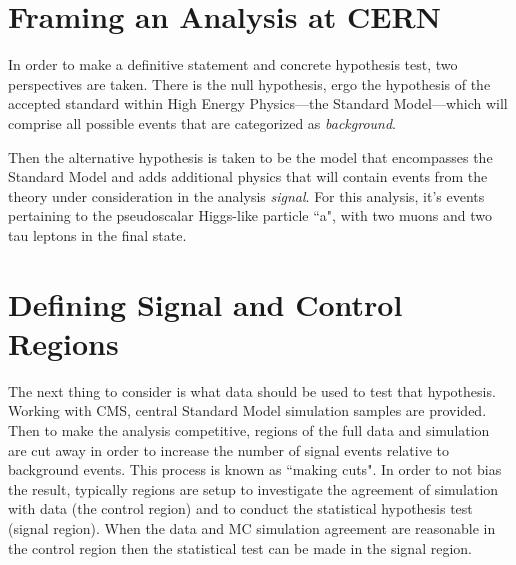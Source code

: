 \section{Framing an Analysis at CERN}
In order to make a definitive statement and concrete hypothesis test, two perspectives are taken. 
There is the null hypothesis, ergo the hypothesis of the accepted standard within High Energy Physics---the Standard Model---which will comprise all possible events that are categorized as \textit{background}. 


Then the alternative hypothesis is taken to be the model that encompasses the Standard Model and adds additional physics that will contain events from the theory under consideration in the analysis \textit{signal}. For this analysis, it's events pertaining to the pseudoscalar Higgs-like particle ``a", with two muons and two tau leptons in the final state. 

\section{Defining Signal and Control Regions}
The next thing to consider is what data should be used to test that hypothesis. Working with CMS, central Standard Model simulation samples are provided. Then to make the analysis competitive, regions of the full data and simulation are cut away in order to increase the number of signal events relative to background events. This process is known as ``making cuts". In order to not bias the result, typically regions are setup to investigate the agreement of simulation with data (the control region) and to conduct the statistical hypothesis test (signal region). When the data and MC simulation agreement are reasonable in the control region then the statistical test can be made in the signal region.  



